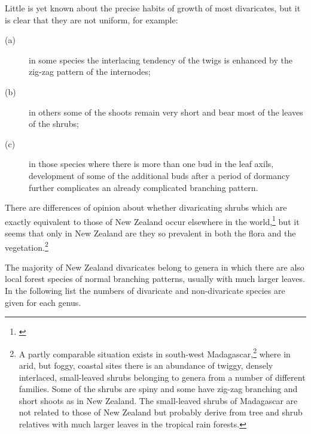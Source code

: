 Little is yet known about the precise habits of growth of most divaricates, but it is clear that they are not uniform, for example: \begin{description}
\item[{(a)}]in some species the interlacing tendency of the twigs is enhanced by the zig-zag pattern of the internodes;
\item[{(b)}]in others some of the shoots remain very short and bear most of the leaves of the shrubs;
\item[{(c)}]in those species where there is more than one bud in the leaf axils, development of some of the additional buds after a period of dormancy further complicates an already complicated branching pattern.
\end{description}

There are differences of opinion about whether divaricating shrubs which are exactly equivalent to those of New Zealand occur elsewhere in the world,\footnote{\cite{greenwood1977evolution}} but it seems that only in New Zealand are they so prevalent in both the flora and the vegetation.\footnote{A partly comparable situation exists in south-west Madagascar,\footnote{\cite{koechlinj1974flore}} where in arid, but foggy, coastal sites there is an abundance of twiggy, densely interlaced, small-leaved shrubs belonging to genera from a number of different families. Some of the shrubs are spiny and some have zig-zag branching and short shoots as in New Zealand. The small-leaved shrubs of Madagascar are not related to those of New Zealand but probably derive from tree and shrub relatives with much larger leaves in the tropical rain forests.}

The majority of New Zealand divaricates belong to genera in which there are also local forest species of normal branching patterns, usually with much larger leaves.
In the following list the numbers of divaricate and non-divaricate species are given for each genus.

